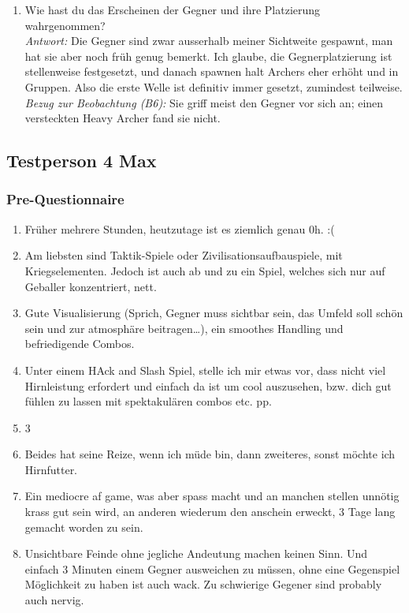 \documentclass[../Main.tex]{subfiles}
\begin{document}
\begin{enumerate}[label=\textbf{I\arabic*}, leftmargin=1.5cm, itemsep=1em]
\item Wie hast du das Erscheinen der Gegner und ihre Platzierung wahrgenommen? \\
\textit{Antwort:} Die Gegner sind zwar ausserhalb meiner Sichtweite gespawnt, man hat sie aber noch früh genug bemerkt. Ich glaube, die Gegnerplatzierung ist stellenweise festgesetzt, und danach spawnen halt Archers eher erhöht und in Gruppen. Also die erste Welle ist definitiv immer gesetzt, zumindest teilweise. \\
\textit{Bezug zur Beobachtung (B6):} Sie griff meist den Gegner vor sich an; einen versteckten Heavy Archer fand sie nicht.
\end{enumerate}

\subsection{Testperson 4 Max}

\subsubsection{Pre-Questionnaire}

\begin{enumerate}[label=\textbf{P\arabic*}, leftmargin=1.5cm, itemsep=0.5em]
\item Früher mehrere Stunden, heutzutage ist es ziemlich genau 0h. :(
\item Am liebsten sind Taktik-Spiele oder Zivilisationsaufbauspiele, mit Kriegselementen. Jedoch ist auch ab und zu ein Spiel, welches sich nur auf Geballer konzentriert, nett.
\item Gute Visualisierung (Sprich, Gegner muss sichtbar sein, das Umfeld soll schön sein und zur atmosphäre beitragen…), ein smoothes Handling und befriedigende Combos.
\item Unter einem HAck and Slash Spiel, stelle ich mir etwas vor, dass nicht viel Hirnleistung erfordert und einfach da ist um cool auszusehen, bzw. dich gut fühlen zu lassen mit spektakulären combos etc. pp.
\item 3
\item Beides hat seine Reize, wenn ich müde bin, dann zweiteres, sonst möchte ich Hirnfutter.
\item Ein mediocre af game, was aber spass macht und an manchen stellen unnötig krass gut sein wird, an anderen wiederum den anschein erweckt, 3 Tage lang gemacht worden zu sein.
\item Unsichtbare Feinde ohne jegliche Andeutung machen keinen Sinn. Und einfach 3 Minuten einem Gegner ausweichen zu müssen, ohne eine Gegenspiel Möglichkeit zu haben ist auch wack. Zu schwierige Gegener sind probably auch nervig.
\end{enumerate}
\end{document}
